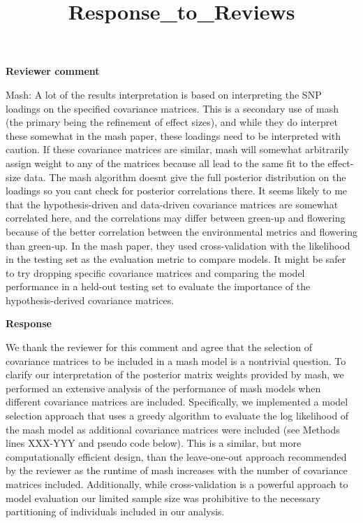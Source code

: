 \documentclass[
  letterpaper,
  DIV=11,
  numbers=noendperiod]{scrartcl}
\title{Response\_to\_Reviews}
\author{}
\date{}
\begin{document}
\maketitle
\textbf{Reviewer comment}

Mash: A lot of the results interpretation is based on interpreting the
SNP loadings on the specified covariance matrices. This is a secondary
use of mash (the primary being the refinement of effect sizes), and
while they do interpret these somewhat in the mash paper, these loadings
need to be interpreted with caution. If these covariance matrices are
similar, mash will somewhat arbitrarily assign weight to any of the
matrices because all lead to the same fit to the effect-size data. The
mash algorithm doesn\textquotesingle t give the full posterior
distribution on the loadings so you can\textquotesingle t check for
posterior correlations there. It seems likely to me that the
hypothesis-driven and data-driven covariance matrices are somewhat
correlated here, and the correlations may differ between green-up and
flowering because of the better correlation between the environmental
metrics and flowering than green-up. In the mash paper, they used
cross-validation with the likelihood in the testing set as the
evaluation metric to compare models. It might be safer to try dropping
specific covariance matrices and comparing the model performance in a
held-out testing set to evaluate the importance of the
hypothesis-derived covariance matrices.

\hfill\break

\textbf{Response}

We thank the reviewer for this comment and agree that the selection of
covariance matrices to be included in a mash model is a nontrivial
question. To clarify our interpretation of the posterior matrix weights
provided by mash, we performed an extensive analysis of the performance
of mash models when different covariance matrices are included.
Specifically, we implemented a model selection approach that uses a
greedy algorithm to evaluate the log likelihood of the mash model as
additional covariance matrices were included (see Methods lines XXX-YYY
and pseudo code below). This is a similar, but more computationally
efficient design, than the leave-one-out approach recommended by the
reviewer as the runtime of mash increases with the number of covariance
matrices included. Additionally, while cross-validation is a powerful
approach to model evaluation our limited sample size was prohibitive to
the necessary partitioning of individuals included in our analysis.
\end{document}
